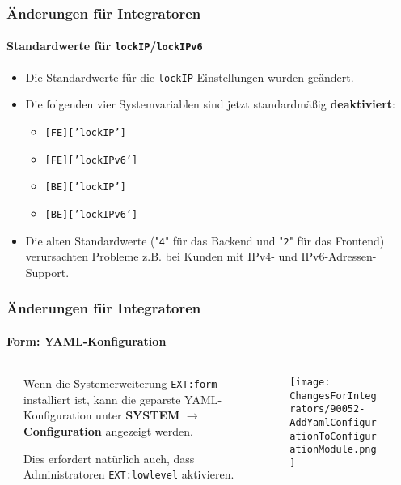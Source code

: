\begin{frame}[fragile]
	\frametitle{Änderungen für Integratoren}
	\framesubtitle{Standardwerte für \texttt{lockIP}/\texttt{lockIPv6}}

	\lstset{basicstyle=\smaller\ttfamily}

	\begin{itemize}
		\item Die Standardwerte für die \texttt{lockIP} Einstellungen wurden geändert.
		\item Die folgenden vier Systemvariablen sind jetzt standardmäßig \textbf{deaktiviert}:

			\begin{itemize}
				\item \texttt{[FE]['lockIP']}
				\item \texttt{[FE]['lockIPv6']}
				\item \texttt{[BE]['lockIP']}
				\item \texttt{[BE]['lockIPv6']}
			\end{itemize}

		\item Die alten Standardwerte ("\texttt{4}" für das Backend und "\texttt{2}" für das Frontend)
			verursachten Probleme z.B. bei Kunden mit IPv4- und IPv6-Adressen-Support.

	\end{itemize}

\end{frame}


\begin{frame}[fragile]
	\frametitle{Änderungen für Integratoren}
	\framesubtitle{Form: YAML-Konfiguration}

	\begin{columns}[T]
		\begin{column}{.04\textwidth}
		\end{column}
		\begin{column}{.38\textwidth}

			Wenn die Systemerweiterung \texttt{EXT:form} installiert ist, kann die geparste YAML-Konfiguration
			unter \textbf{SYSTEM} $\rightarrow$ \textbf{Configuration} angezeigt werden.

			\vspace{0.2cm}

			Dies erfordert natürlich auch, dass Administratoren \texttt{EXT:lowlevel} aktivieren.

		\end{column}
		\begin{column}{.58\textwidth}
			\vspace{-0.3cm}
			\begin{figure}
				\texttt{[image: ChangesForIntegrators/90052-AddYamlConfigurationToConfigurationModule.png]}
			\end{figure}
		\end{column}
	\end{columns}

\end{frame}


